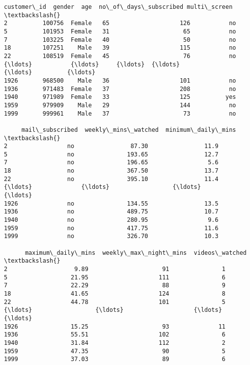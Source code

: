 \documentclass[11pt]{article}
\makeatletter
\newcommand{\boxspacing}{\kern\kvtcb@left@rule\kern\kvtcb@boxsep}
\newcommand{\prompt}[4]{
        {\ttfamily\llap{{\color{#2}[#3]:\hspace{3pt}#4}}\vspace{-\baselineskip}}
    }
\makeatother
\begin{document}
            \begin{tcolorbox}[breakable, size=fbox, boxrule=.5pt, pad at break*=1mm, opacityfill=0]
\prompt{Out}{outcolor}{53}{\boxspacing}
\begin{Verbatim}[commandchars=\\\{\}]
      customer\_id  gender  age  no\_of\_days\_subscribed multi\_screen  \textbackslash{}
2          100756  Female   65                    126           no
5          101953  Female   31                     65           no
7          103225  Female   40                     50           no
18         107251    Male   39                    115           no
22         108519  Female   45                     76           no
{\ldots}           {\ldots}     {\ldots}  {\ldots}                    {\ldots}          {\ldots}
1926       968500    Male   36                    101           no
1936       971483  Female   37                    208           no
1940       971989  Female   33                    125          yes
1959       979909    Male   29                    144           no
1999       999961    Male   37                     73           no

     mail\_subscribed  weekly\_mins\_watched  minimum\_daily\_mins  \textbackslash{}
2                 no                87.30                11.9
5                 no               193.65                12.7
7                 no               196.65                 5.6
18                no               367.50                13.7
22                no               395.10                11.4
{\ldots}              {\ldots}                  {\ldots}                 {\ldots}
1926              no               134.55                13.5
1936              no               489.75                10.7
1940              no               280.95                 9.6
1959              no               417.75                11.6
1999              no               326.70                10.3

      maximum\_daily\_mins  weekly\_max\_night\_mins  videos\_watched  \textbackslash{}
2                   9.89                     91               1
5                  21.95                    111               6
7                  22.29                     88               9
18                 41.65                    124               8
22                 44.78                    101               5
{\ldots}                  {\ldots}                    {\ldots}             {\ldots}
1926               15.25                     93              11
1936               55.51                    102               6
1940               31.84                    112               2
1959               47.35                     90               5
1999               37.03                     89               6


\end{Verbatim}
\end{tcolorbox}
\end{document}
